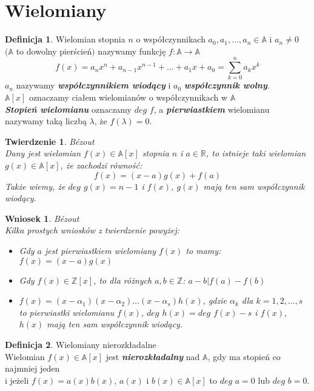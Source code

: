 \documentclass[10pt,a4paper]{article}
\theoremstyle{plain}
\newtheorem{thm}{Twierdzenie}[section]
\newtheorem*{cor}{Wniosek}
\theoremstyle{definition}
\newtheorem{defi}{Definicja}[section]
\theoremstyle{remark}
\newcommand{\Z}{\mathbb{Z}}
\newcommand{\R}{\mathbb{R}}
\newcommand{\A}{\mathbb{A}}
\begin{document}
	\section{Wielomiany}
	\begin{defi}
		Wielomian stopnia $n$ o współczynnikach $a_0,a_1,\ldots,a_n \in \A$ i $a_n \neq 0$ \\ $(\A$ to dowolny pierścień$)$ nazywamy funkcję $f:\A \rightarrow \A$
		$$f(x)=a_nx^n+a_{n-1}x^{n-1}+\ldots+a_1x+a_0 = \sum_{k=0}^{n}a_kx^k$$
		$a_n$ nazywamy \textbf{\textit{współczynnikiem wiodący}} i $a_0$ \textbf{\textit{współczynnik wolny}}.  
		\\ $\A[x]$ oznaczamy ciałem wielomianów o współczynnikach w $\A$
		\\
		\textbf{\textit{Stopień wielomianu}} oznaczamy $deg$ $f$, a \textbf{\textit{pierwiastkiem}} wielomianu nazywamy taką liczbą $\lambda$, że $f(\lambda)=0$.
	\end{defi}
	\begin{thm}{Bézout}
		\\
		Dany jest wielomian $f(x) \in \A[x]$ stopnia $n$ i $a \in \R$, to istnieje taki wielomian $g(x) \in \A[x]$, że zachodzi równość: 
		$$f(x)=(x-a)g(x)+f(a)$$
		Także wiemy, że $deg$ $g(x) = n-1$ i $f(x)$, $g(x)$ mają ten sam współczynnik wiodący. 
	\end{thm}
	\begin{cor}{Bézout}
		\\
		Kilka prostych wniosków z twierdzenie powyżej:
		\begin{itemize}
			\item 
			Gdy $a$ jest pierwiastkiem wielomiany $f(x)$ to mamy: $f(x)=(x-a)g(x)$
			\item
			Gdy $f(x) \in \Z[x]$, to dla różnych $a,b \in \Z$: $a-b|f(a)-f(b)$
			\item
			$f(x)=(x-\alpha_1)(x-\alpha_2)\ldots(x-\alpha_s)h(x)$, gdzie $\alpha_k$ dla $k=1,2,\ldots,s$ to pierwiastki wielomianu $f(x)$, $deg$ $h(x)=deg$ $f(x)-s$ i $f(x)$, $h(x)$ mają ten sam współczynnik wiodący. 
		\end{itemize}
	\end{cor}
	\begin{defi}{Wielomiany nierozkładalne}
		\\
		Wielomian $f(x) \in \A[x]$ jest \textbf{\textit{nierozkładalny}} nad $\A$, gdy ma stopień co najmniej jeden 
		\\ i jeżeli $f(x)=a(x)b(x)$, $a(x)$ i $b(x) \in \A[x]$ to $deg$ $a=0$ lub $deg$ $b=0$.
	\end{defi}
\end{document}
